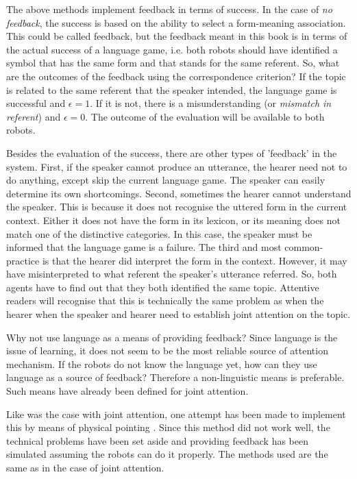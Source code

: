 The above methods implement feedback in terms of success. In the case of {\em no feedback}, the success is based on the ability to select a form-meaning association. This could be called feedback, but the feedback meant in this book is in terms of the actual success of a language game, i.e. both robots should have identified a symbol that has the same form and that stands for the same referent. So, what are the outcomes of the feedback using the correspondence criterion? If the topic is related to the same referent that the speaker intended, the language game is successful and $\epsilon=1$. If it is not, there is a misunderstanding (or {\em mismatch in referent}) and $\epsilon=0$. The outcome of the evaluation will be available to both robots.

Besides the evaluation of the success, there are other types of 'feedback' in the system. First, if the speaker cannot produce an utterance, the hearer need not to do anything, except skip the current language game. The speaker can easily determine its own shortcomings. Second, sometimes the hearer cannot understand the speaker. This is because it does not recognise the uttered form in the current context. Either it does not have the form in its lexicon, or its meaning does not match one of the distinctive categories. In this case, the speaker must be informed that the language game is a failure. The third and most common-practice is that the hearer did interpret the form in the context. However, it may have misinterpreted to what referent the speaker's utterance referred. So, both agents have to find out that they both identified the same topic. Attentive readers will recognise that this is technically the same problem as when the hearer when the speaker and hearer need to establish joint attention on the topic.

Why not use language as a means of providing feedback? Since language is the issue of learning, it does not seem to be the most reliable source of attention mechanism.  If the robots do not know the language yet, how can they use language as a source of feedback? Therefore a non-linguistic means is preferable. Such means have already been defined for joint attention.


Like was the case with joint attention, one attempt has been made to implement this by means of physical pointing \citep{vogt:1998b}. Since this method did not work well, the technical problems have been set aside and providing feedback has been simulated assuming the robots can do it properly. The methods used are the same as in the case of joint attention.


